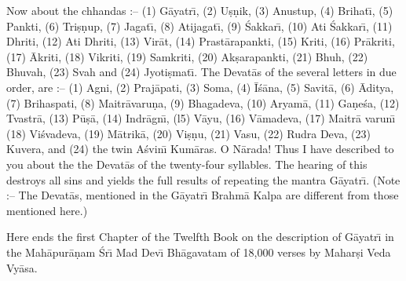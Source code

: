 Now about the chhandas :-- (1) G\=ayatr\={\i}, (2) U\d{s}\d{n}ik, (3) Anustup, (4) Brihat\={\i}, (5) Pankti, (6) Tri\d{s}\d{n}up, (7) Jagat\={\i}, (8) Atijagat\={\i}, (9) \'Sakkar\={\i}, (10) Ati \'Sakkar\={\i}, (11) Dhriti, (12) Ati Dhriti, (13) Vir\=at, (14) Prast\=arapankti, (15) Kriti, (16) Pr\=akriti, (17) \=Akriti, (18) Vikriti, (19) Samkriti, (20) Ak\d{s}arapankti, (21) Bhuh, (22) Bhuvah, (23) Svah and (24) Jyoti\d{s}mat\={\i}. The Devat\=as of the several letters in due order, are :-- (1) Agni, (2) Praj\=apati, (3) Soma, (4) \=I\'s\=ana, (5) Savit\=a, (6) \=Aditya, (7) Brihaspati, (8) Maitr\=avaru\d{n}a, (9) Bhagadeva, (10) Aryam\=a, (11) Ga\d{n}e\'sa, (12) Tvastr\=a, (13) P\=u\d{s}\=a, (14) Indr\=agn\={\i}, (l5) V\=ayu, (16) V\=amadeva, (17) Maitr\=a varun\={\i} (18) Vi\'svadeva, (19) M\=atrik\=a, (20) Vi\d{s}\d{n}u, (21) Vasu, (22) Rudra Deva, (23) Kuvera, and (24) the twin A\'svin\={\i} Kum\=aras. O N\=arada! Thus I have described to you about the the Devat\=as of the twenty-four syllables. The hearing of this destroys all sins and yields the full results of repeating the mantra G\=ayatr\={\i}. (Note :-- The Devat\=as, mentioned in the G\=ayatr\={\i} Brahm\=a Kalpa are different from those mentioned here.)

Here ends the first Chapter of the Twelfth Book on the description of G\=ayatr\={\i} in the Mah\=apur\=a\d{n}am \'Sr\={\i} Mad Dev\={\i} Bh\=agavatam of 18,000 verses by Mahar\d{s}i Veda Vy\=asa.



